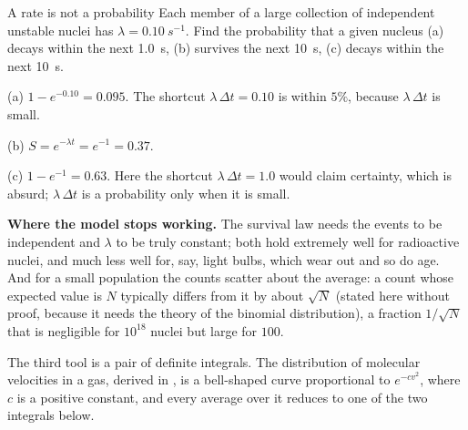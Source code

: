 \begin{exbox}{A rate is not a probability}
Each member of a large collection of independent unstable nuclei has $\lambda=\SI{0.10}{s^{-1}}$. Find
the probability that a given nucleus (a) decays within the next \SI{1.0}{s}, (b) survives the next
\SI{10}{s}, (c) decays within the next \SI{10}{s}.

 (a) $1-e^{-0.10}=0.095$. The shortcut $\lambda\,\Delta t=0.10$ is within $5\%$, because
$\lambda\,\Delta t$ is small.

 (b) $S=e^{-\lambda t}=e^{-1}=0.37$.

 (c) $1-e^{-1}=0.63$. Here the shortcut $\lambda\,\Delta t=1.0$ would claim certainty, which is
absurd; $\lambda\,\Delta t$ is a probability only when it is small.
\end{exbox}

\textbf{Where the model stops working.} The survival law needs the events to be independent and
$\lambda$ to be truly constant; both hold extremely well for radioactive nuclei, and much less well for,
say, light bulbs, which wear out and so do age. And for a small population the counts scatter about the
average: a count whose expected value is $N$ typically differs from it by about $\sqrt N$ (stated here
without proof, because it needs the theory of the binomial distribution), a fraction $1/\sqrt N$ that is
negligible for $10^{18}$ nuclei but large for $100$.

The third tool is a pair of definite integrals. The distribution of molecular velocities in a gas,
derived in , is a bell-shaped curve proportional to $e^{-cv^2}$, where $c$ is a positive
constant, and every average over it reduces to one of the two integrals below.

